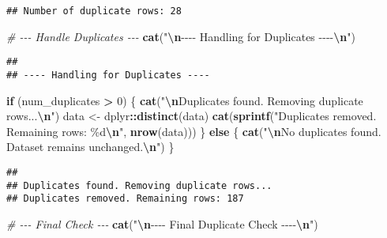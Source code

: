 \documentclass[
]{article}
\newenvironment{Shaded}{\begin{snugshade}}{\end{snugshade}}
\newcommand{\CommentTok}[1]{\textcolor[rgb]{0.56,0.35,0.01}{\textit{#1}}}
\newcommand{\ControlFlowTok}[1]{\textcolor[rgb]{0.13,0.29,0.53}{\textbf{#1}}}
\newcommand{\DecValTok}[1]{\textcolor[rgb]{0.00,0.00,0.81}{#1}}
\newcommand{\FunctionTok}[1]{\textcolor[rgb]{0.13,0.29,0.53}{\textbf{#1}}}
\newcommand{\NormalTok}[1]{#1}
\newcommand{\OtherTok}[1]{\textcolor[rgb]{0.56,0.35,0.01}{#1}}
\newcommand{\SpecialCharTok}[1]{\textcolor[rgb]{0.81,0.36,0.00}{\textbf{#1}}}
\newcommand{\StringTok}[1]{\textcolor[rgb]{0.31,0.60,0.02}{#1}}
\begin{document}
\begin{verbatim}
## Number of duplicate rows: 28
\end{verbatim}

\begin{Shaded}
\begin{Highlighting}[]
\CommentTok{\# {-}{-}{-} Handle Duplicates {-}{-}{-}}
\FunctionTok{cat}\NormalTok{(}\StringTok{"}\SpecialCharTok{\textbackslash{}n}\StringTok{{-}{-}{-}{-} Handling for Duplicates {-}{-}{-}{-}}\SpecialCharTok{\textbackslash{}n}\StringTok{"}\NormalTok{)}
\end{Highlighting}
\end{Shaded}

\begin{verbatim}
## 
## ---- Handling for Duplicates ----
\end{verbatim}

\begin{Shaded}
\begin{Highlighting}[]
\ControlFlowTok{if}\NormalTok{ (num\_duplicates }\SpecialCharTok{\textgreater{}} \DecValTok{0}\NormalTok{) \{}
  \FunctionTok{cat}\NormalTok{(}\StringTok{"}\SpecialCharTok{\textbackslash{}n}\StringTok{Duplicates found. Removing duplicate rows...}\SpecialCharTok{\textbackslash{}n}\StringTok{"}\NormalTok{)}
\NormalTok{  data }\OtherTok{\textless{}{-}}\NormalTok{ dplyr}\SpecialCharTok{::}\FunctionTok{distinct}\NormalTok{(data)}
  \FunctionTok{cat}\NormalTok{(}\FunctionTok{sprintf}\NormalTok{(}\StringTok{"Duplicates removed. Remaining rows: \%d}\SpecialCharTok{\textbackslash{}n}\StringTok{"}\NormalTok{, }\FunctionTok{nrow}\NormalTok{(data)))}
\NormalTok{\} }\ControlFlowTok{else}\NormalTok{ \{}
  \FunctionTok{cat}\NormalTok{(}\StringTok{"}\SpecialCharTok{\textbackslash{}n}\StringTok{No duplicates found. Dataset remains unchanged.}\SpecialCharTok{\textbackslash{}n}\StringTok{"}\NormalTok{)}
\NormalTok{\}}
\end{Highlighting}
\end{Shaded}

\begin{verbatim}
## 
## Duplicates found. Removing duplicate rows...
## Duplicates removed. Remaining rows: 187
\end{verbatim}

\begin{Shaded}
\begin{Highlighting}[]
\CommentTok{\# {-}{-}{-} Final Check {-}{-}{-}}
\FunctionTok{cat}\NormalTok{(}\StringTok{"}\SpecialCharTok{\textbackslash{}n}\StringTok{{-}{-}{-}{-} Final Duplicate Check {-}{-}{-}{-}}\SpecialCharTok{\textbackslash{}n}\StringTok{"}\NormalTok{)}
\end{Highlighting}
\end{Shaded}
\end{document}
